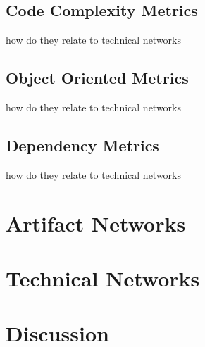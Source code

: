 \subsection{Code Complexity Metrics}
how do they relate to technical networks
\subsection{Object Oriented Metrics}
how do they relate to technical networks
\subsection{Dependency Metrics}
how do they relate to technical networks

\section{Artifact Networks}
\label{chap:6:an}
\section{Technical Networks}
\label{chap:6:tn}
\section{Discussion}
\label{chap:6:dis}

